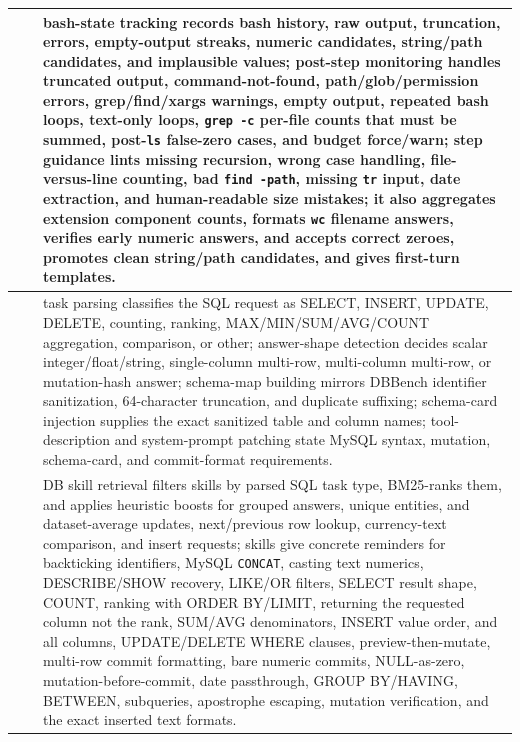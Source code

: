 \begin{table}[t]
\begin{tabular}{>{\centering\arraybackslash}m{}>{\centering\arraybackslash}m{}p{}}
\cmidrule(lr){2-3}
& \multirow{7}{*}{Trajectory Regulation Layer}
& bash-state tracking records bash history, raw output, truncation, errors,
empty-output streaks, numeric candidates, string/path candidates, and implausible
values; post-step monitoring handles truncated output, command-not-found,
path/glob/permission errors, grep/find/xargs warnings, empty output, repeated
bash loops, text-only loops, \texttt{grep -c} per-file counts that must be
summed, post-\texttt{ls} false-zero cases, and budget force/warn; step guidance
lints missing recursion, wrong case handling, file-versus-line counting, bad
\texttt{find -path}, missing \texttt{tr} input, date extraction, and human-readable
size mistakes; it also aggregates extension component counts, formats
\texttt{wc} filename answers, verifies early numeric answers, and accepts correct
zeroes, promotes clean string/path candidates, and gives first-turn templates. \\
\midrule
\multirow{32}{*}{\centering DBBench}
& \multirow{6}{*}{Environment Contract Layer}
& task parsing classifies the SQL request as SELECT, INSERT, UPDATE,
DELETE, counting, ranking, MAX/MIN/SUM/AVG/COUNT aggregation, comparison, or
other; answer-shape detection decides scalar integer/float/string, single-column
multi-row, multi-column multi-row, or mutation-hash answer; schema-map building
mirrors DBBench identifier sanitization, 64-character truncation, and duplicate
suffixing; schema-card injection supplies the exact sanitized table and column names;
tool-description and system-prompt patching state MySQL
syntax, mutation, schema-card, and commit-format requirements. \\
\cmidrule(lr){2-3}
& \multirow{8}{*}{Procedural Skill Layer}
& DB skill retrieval filters skills by parsed SQL task type, BM25-ranks them,
and applies heuristic boosts for grouped answers, unique entities, and dataset-average
updates, next/previous row lookup, currency-text comparison, and insert requests;
skills give concrete reminders for backticking identifiers, MySQL
\texttt{CONCAT}, casting text numerics, DESCRIBE/SHOW recovery, LIKE/OR filters,
SELECT result shape, COUNT, ranking with ORDER BY/LIMIT, returning the requested
column not the rank, SUM/AVG denominators, INSERT value order, and all columns,
UPDATE/DELETE WHERE clauses, preview-then-mutate, multi-row commit formatting,
bare numeric commits, NULL-as-zero, mutation-before-commit, date passthrough,
GROUP BY/HAVING, BETWEEN, subqueries, apostrophe escaping, mutation verification,
and the exact inserted text formats. \\

\end{tabular}
\end{table}
